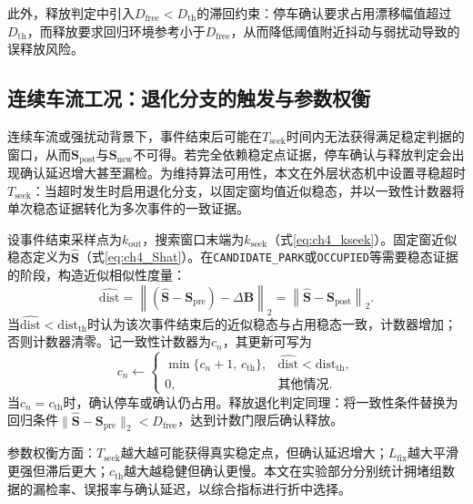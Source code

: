 \documentclass{xdupgthesis}
\begin{document}
此外，释放判定中引入$D_{\mathrm{free}}<D_{\mathrm{th}}$的滞回约束：停车确认要求占用漂移幅值超过$D_{\mathrm{th}}$，而释放要求回归环境参考小于$D_{\mathrm{free}}$，从而降低阈值附近抖动与弱扰动导致的误释放风险。

\subsection{连续车流工况：退化分支的触发与参数权衡}
\label{subsec:ch4_degrade_param}

连续车流或强扰动背景下，事件结束后可能在$T_{\mathrm{seek}}$时间内无法获得满足稳定判据的窗口，从而$\mathbf{S}_{\mathrm{post}}$与$\mathbf{S}_{\mathrm{new}}$不可得。若完全依赖稳定点证据，停车确认与释放判定会出现确认延迟增大甚至漏检。为维持算法可用性，本文在外层状态机中设置寻稳超时$T_{\mathrm{seek}}$：当超时发生时启用退化分支，以固定窗均值近似稳态，并以一致性计数器将单次稳态证据转化为多次事件的一致证据。

设事件结束采样点为$k_{\mathrm{out}}$，搜索窗口末端为$k_{\mathrm{seek}}$（式\eqref{eq:ch4_kseek}）。固定窗近似稳态定义为$\hat{\mathbf{S}}$（式\eqref{eq:ch4_Shat}）。在\texttt{CANDIDATE\_PARK}或\texttt{OCCUPIED}等需要稳态证据的阶段，构造近似相似性度量：
\begin{equation}
\widehat{\mathrm{dist}} = \left\lVert \left(\hat{\mathbf{S}}-\mathbf{S}_{\mathrm{pre}}\right) - \Delta\mathbf{B}\right\rVert_2
= \left\lVert \hat{\mathbf{S}}-\mathbf{S}_{\mathrm{post}}\right\rVert_2 .
\label{eq:ch4_hatdist}
\end{equation}
当$\widehat{\mathrm{dist}}<\mathrm{dist}_{\mathrm{th}}$时认为该次事件结束后的近似稳态与占用稳态一致，计数器增加；否则计数器清零。记一致性计数器为$c_n$，其更新可写为
\begin{equation}
c_n \leftarrow
\begin{cases}
\min\{c_n+1,\,c_{\mathrm{th}}\}, & \widehat{\mathrm{dist}}<\mathrm{dist}_{\mathrm{th}},\\
0, & \text{其他情况}.
\end{cases}
\label{eq:ch4_cn_update}
\end{equation}
当$c_n=c_{\mathrm{th}}$时，确认停车或确认仍占用。释放退化判定同理：将一致性条件替换为回归条件$\lVert \hat{\mathbf{S}}-\mathbf{S}_{\mathrm{pre}}\rVert_2 < D_{\mathrm{free}}$，达到计数门限后确认释放。

参数权衡方面：$T_{\mathrm{seek}}$越大越可能获得真实稳定点，但确认延迟增大；$L_{\mathrm{fix}}$越大平滑更强但滞后更大；$c_{\mathrm{th}}$越大越稳健但确认更慢。本文在实验部分分别统计拥堵组数据的漏检率、误报率与确认延迟，以综合指标进行折中选择。
\end{document}
